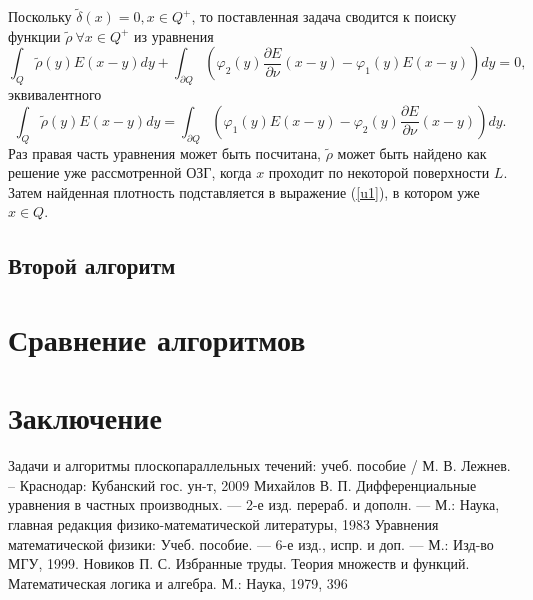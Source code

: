 \documentclass[a4paper, 12pt]{article}
\newcommand{\der}[2]{\dfrac{\partial #1}{\partial #2}}
\begin{document}
Поскольку $\tilde{\delta}(x)=0, x \in Q^+$, то поставленная задача сводится к поиску функции $\tilde{\rho}\ \forall x \in Q^+$ из уравнения
\begin{equation}
    \int_Q \tilde{\rho}(y) E(x-y) dy + \int_{\partial Q} \left(\varphi_2(y)\der{E}{\nu}(x-y)-\varphi_1(y) E(x-y) \right) dy=0,
\end{equation} 
эквивалентного 
\begin{equation}
    \int_Q \tilde{\rho}(y) E(x-y) dy = \int_{\partial Q} \left(\varphi_1(y) E(x-y) -\varphi_2(y)\der{E}{\nu}(x-y)\right) dy.
    \label{bgogz}
\end{equation} 
Раз правая часть уравнения может быть посчитана, $\tilde{\rho}$ может быть найдено как решение уже рассмотренной ОЗГ, когда $x$ проходит по некоторой поверхности $L$.
Затем найденная плотность подставляется в выражение (\ref{u1}), в котором уже $x \in Q$.

\subsection{Второй алгоритм}

\section{Сравнение алгоритмов}

\section*{Заключение}


\begin{thebibliography}{15} 
  Задачи и алгоритмы плоскопараллельных течений: учеб. пособие / М. В. Лежнев. -- Краснодар: Кубанский гос. ун-т, 2009
  Михайлов В. П. Дифференциальные уравнения в частных производных. --- 2-е изд. перераб. и дополн. --- М.: Наука, главная редакция физико-математической литературы, 1983
  Уравнения математической физики: Учеб. пособие. --- 6-е изд., испр. и доп. --- М.: Изд-во МГУ, 1999.
Новиков П. С. Избранные труды. Теория множеств и функций. Математическая логика и алгебра. М.: Наука, 1979, 396 

\end{thebibliography}
\end{document}
